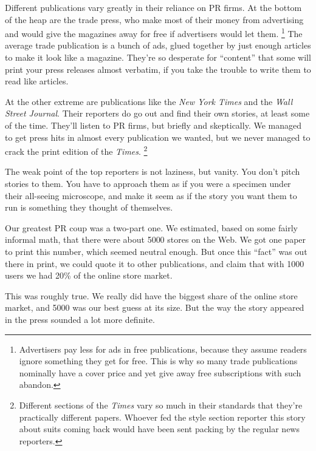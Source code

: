 \documentclass[12pt]{book}
\begin{document}
Different publications vary greatly in their reliance on PR firms. At
the bottom of the heap are the trade press, who make most of their money
from advertising and would give the magazines away for free if
advertisers would let them. \footnote{Advertisers pay less for ads in free publications, because they
assume readers ignore something they get for free. This is why so many
trade publications nominally have a cover price and yet give away free
subscriptions with such abandon.} The average trade
publication is a bunch of ads, glued together by just enough articles to
make it look like a magazine. They're so desperate for ``content'' that
some will print your press releases almost verbatim, if you take the
trouble to write them to read like articles.

At the other extreme are publications like the \emph{New York Times} and
the \emph{Wall Street Journal}. Their reporters do go out and find their
own stories, at least some of the time. They'll listen to PR firms, but
briefly and skeptically. We managed to get press hits in almost every
publication we wanted, but we never managed to crack the print edition
of the \emph{Times}. \footnote{Different sections of the \emph{Times} vary so much in their
standards that they're practically different papers. Whoever fed the
style section reporter this story about suits coming back would have
been sent packing by the regular news reporters.}

The weak point of the top reporters is not laziness, but vanity. You
don't pitch stories to them. You have to approach them as if you were a
specimen under their all-seeing microscope, and make it seem as if the
story you want them to run is something they thought of themselves.

Our greatest PR coup was a two-part one. We estimated, based on some
fairly informal math, that there were about 5000 stores on the Web. We
got one paper to print this number, which seemed neutral enough. But
once this ``fact'' was out there in print, we could quote it to other
publications, and claim that with 1000 users we had 20\% of the online
store market.

This was roughly true. We really did have the biggest share of the
online store market, and 5000 was our best guess at its size. But the
way the story appeared in the press sounded a lot more definite.
\end{document}
